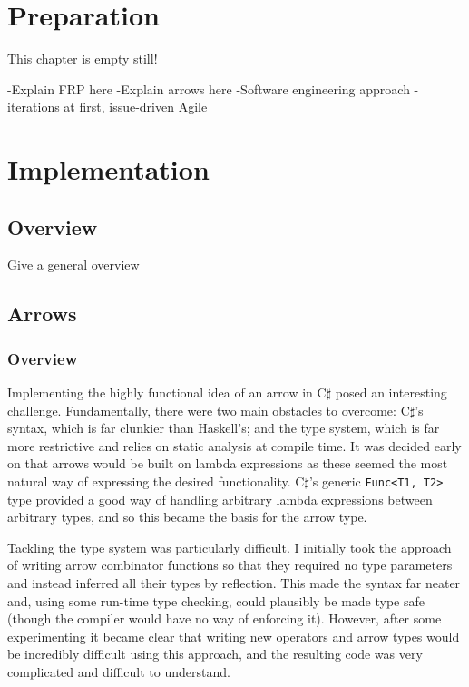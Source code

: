 \documentclass[12pt,twoside,notitlepage]{report}
\begin{document}

\chapter{Preparation}

This chapter is empty still!

-Explain FRP here
-Explain arrows here
-Software engineering approach - iterations at first, issue-driven Agile

\cleardoublepage



\chapter{Implementation}

\section{Overview}

Give a general overview


\section{Arrows}

\subsection{Overview} \label{sec:arrows_overview}

Implementing the highly functional idea of an arrow in C$\sharp$ posed an interesting challenge. Fundamentally, there were two main obstacles to overcome: C$\sharp$'s syntax, which is far clunkier than Haskell's; and the type system, which is far more restrictive and relies on static analysis at compile time. It was decided early on that arrows would be built on lambda expressions as these seemed the most natural way of expressing the desired functionality. C$\sharp$'s generic \texttt{Func<T1, T2>} type provided a good way of handling arbitrary lambda expressions between arbitrary types, and so this became the basis for the arrow type.

Tackling the type system was particularly difficult. I initially took the approach of writing arrow combinator functions so that they required no type parameters and instead inferred all their types by reflection. This made the syntax far neater and, using some run-time type checking, could plausibly be made type safe (though the compiler would have no way of enforcing it). However, after some experimenting it became clear that writing new operators and arrow types would be incredibly difficult using this approach, and the resulting code was very complicated and difficult to understand.
\end{document}

